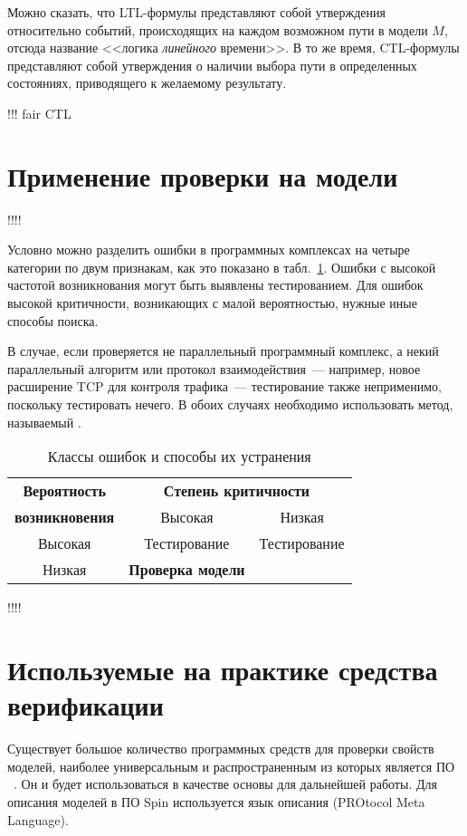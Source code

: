 \documentclass[a4paper,notitlepage,14pt]{article}
\begin{document}
Можно сказать, что LTL-формулы представляют собой утверждения относительно событий,
происходящих на каждом возможном пути в модели $M$, отсюда название <<логика
\emph{линейного} времени>>. В то же время, CTL-формулы представляют собой утверждения о
наличии выбора пути в определенных состояниях, приводящего к желаемому результату.

!!! fair CTL

\section{Применение проверки на модели}
\label{sec:applications}

!!!!

Условно можно разделить ошибки в программных комплексах на четыре категории по двум признакам, как
это показано в табл.~\ref{tab:error-classes}. Ошибки с высокой частотой возникнования
могут быть выявлены тестированием. Для ошибок высокой критичности, возникающих с малой
вероятностью, нужные иные способы поиска.

В случае, если проверяется не параллельный программный комплекс, а некий параллельный
алгоритм или протокол взаимодействия~--- например, новое расширение TCP для контроля
трафика~--- тестирование также неприменимо, поскольку тестировать нечего. В обоих случаях
необходимо использовать метод, называемый .

\begin{table}[hb]
  \centering
  \caption{Классы ошибок и способы их устранения}
  \begin{tabular}{|c|c|c|} \hline
    \textbf{Вероятность} & \multicolumn{2}{|c|}{\bf Степень критичности} \\ \cline{2-3}
    \textbf{возникновения} & Высокая & Низкая \\ \hline
    Высокая & Тестирование & Тестирование \\  \hline
    Низкая  & \textbf{Проверка модели} &  \\  \hline
  \end{tabular}  
  \label{tab:error-classes}
\end{table}

!!!!

\section{Используемые на практике средства верификации}
\label{sec:existing-tools}

Существует большое количество программных средств для проверки свойств моделей, наиболее
универсальным и распространенным из которых является ПО ~\cite{SpinRoot}. Он и
будет использоваться в качестве основы для дальнейшей работы. Для описания моделей в ПО
Spin используется язык описания  (PROtocol Meta Language).
\end{document}
